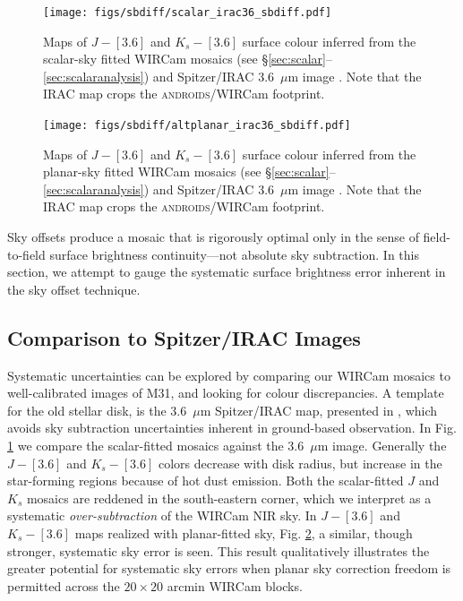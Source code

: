 \documentclass[iop]{emulateapj}
\newcommand{\androids}{\textsc{androids}}
\begin{document}
\begin{figure}[t]
    \centering
        \texttt{[image: figs/sbdiff/scalar\_irac36\_sbdiff.pdf]}
    \caption{Maps of $J-[3.6]$ and $K_s-[3.6]$ surface colour inferred from the scalar-sky fitted WIRCam mosaics (see \S\ref{sec:scalar}--\ref{sec:scalaranalysis}) and Spitzer/IRAC 3.6~$\mu$m image \citep{Barmby:2006}. Note that the IRAC map crops the \androids/WIRCam footprint.}
    \label{fig:scalar_irac36_sbdiff}
\end{figure}

\begin{figure}[t]
    \centering
        \texttt{[image: figs/sbdiff/altplanar\_irac36\_sbdiff.pdf]}
    \caption{Maps of $J-[3.6]$ and $K_s-[3.6]$ surface colour inferred from the planar-sky fitted WIRCam mosaics (see \S\ref{sec:scalar}--\ref{sec:scalaranalysis}) and Spitzer/IRAC 3.6~$\mu$m image \citep{Barmby:2006}. Note that the IRAC map crops the \androids/WIRCam footprint.}
    \label{fig:altplanar_irac36_sbdiff}
\end{figure}

Sky offsets produce a mosaic that is rigorously optimal only in the sense of field-to-field surface brightness continuity---not absolute sky subtraction. In this section, we attempt to gauge the systematic surface brightness error inherent in the sky offset technique.

\subsection{Comparison to Spitzer/IRAC Images}

Systematic uncertainties can be explored by comparing our WIRCam mosaics to well-calibrated images of M31, and looking for colour discrepancies.
A template for the old stellar disk, is the 3.6~$\mu$m Spitzer/IRAC map, presented in \cite{Barmby:2006}, which avoids sky subtraction uncertainties inherent in ground-based observation.
In Fig. \ref{fig:scalar_irac36_sbdiff} we compare the scalar-fitted mosaics against the 3.6~$\mu$m image. Generally the $J-[3.6]$ and $K_s-[3.6]$ colors decrease with disk radius, but increase in the star-forming regions because of hot dust emission. Both the scalar-fitted $J$ and $K_s$ mosaics are reddened in the south-eastern corner, which we interpret as a systematic \emph{over-subtraction} of the WIRCam NIR sky. In $J-[3.6]$ and $K_s-[3.6]$ maps realized with planar-fitted sky, Fig. \ref{fig:altplanar_irac36_sbdiff}, a similar, though stronger, systematic sky error is seen. This result qualitatively illustrates the greater potential for systematic sky errors when planar sky correction freedom is permitted across the $20\times 20$ arcmin WIRCam blocks.
\end{document}
